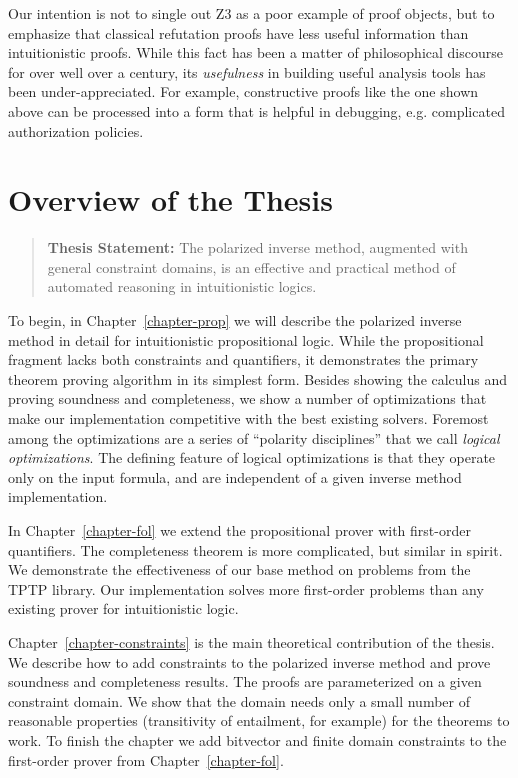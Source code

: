 Our intention is not to single out Z3 as a poor example of proof objects, but to
emphasize that classical refutation proofs have less useful information than
intuitionistic proofs.  While this fact has been a matter of philosophical
discourse for over well over a century, its \emph{usefulness} in building
useful analysis tools has been under-appreciated.  For example, constructive
proofs like the one shown above can be processed into a form
that is helpful in debugging, e.g. complicated authorization policies.

\section{Overview of the Thesis}

\begin{quote}
\textbf{Thesis Statement:} The polarized inverse method, augmented with
general constraint domains, is an effective and practical method of
automated reasoning in intuitionistic logics.
\end{quote}

To begin, in Chapter~\ref{chapter-prop} we will describe the polarized inverse
method in detail for intuitionistic propositional logic.  While the
propositional fragment lacks both constraints and quantifiers, it demonstrates
the primary theorem proving algorithm in its simplest form.  Besides showing the
calculus and proving soundness and completeness, we show a number of
optimizations that make our implementation competitive with the best existing
solvers.  Foremost among the optimizations are a series of ``polarity
disciplines'' that we call \emph{logical optimizations}.  The defining feature
of logical optimizations is that they operate only on the input formula, and are
independent of a given inverse method implementation.

In Chapter~\ref{chapter-fol} we extend the propositional prover with first-order
quantifiers.  The completeness theorem is more complicated, but similar in
spirit.  We demonstrate the effectiveness of our base method on problems from
the TPTP library.  Our implementation solves more first-order problems than any
existing prover for intuitionistic logic.

Chapter~\ref{chapter-constraints} is the main theoretical contribution of the
thesis.  We describe how to add constraints to the polarized inverse method and
prove soundness and completeness results.  The proofs are parameterized on a
given constraint domain.  We show that the domain needs only a small number of
reasonable properties (transitivity of entailment, for example) for the theorems
to work.  To finish the chapter we add bitvector and finite domain constraints
to the first-order prover from Chapter~\ref{chapter-fol}.

